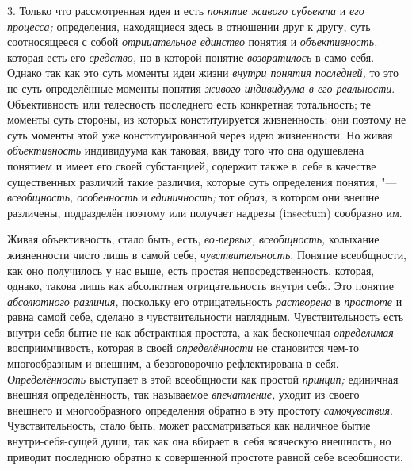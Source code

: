 3. Только что рассмотренная идея и есть {\em понятие живого субъекта}
и {\em его процесса;} определения, находящиеся здесь в отношении друг к другу,
суть соотносящееся с собой {\em отрицательное единство} понятия и
{\em объективность,} которая есть его {\em средство,} но в которой понятие
{\em возвратилось} в само себя. Однако так как это суть моменты идеи жизни
{\em внутри понятия последней,} то это не суть определённые моменты понятия
{\em живого индивидуума в его реальности}.
Объективность или телесность последнего есть
конкретная тотальность; те моменты суть стороны, из которых конституируется
жизненность; они поэтому не суть моменты этой уже конституированной через
идею жизненности. Но живая {\em объективность}
индивидуума как таковая, ввиду того что она одушевлена
понятием и имеет его своей субстанцией, содержит также в~себе в качестве
существенных различий такие различия, которые суть определения понятия, "---
{\em всеобщность, особенность} и {\em единичность;} тот {\em образ,}
в котором они внешне различены, подразделён поэтому или
получает надрезы (insectum) сообразно
им.

Живая объективность, стало быть, есть, {\em во-первых, всеобщность,}
колыхание жизненности чисто лишь в самой себе, {\em чувствительность}.
Понятие всеобщности, как оно получилось у нас выше, есть
простая непосредственность, которая, однако, такова лишь как абсолютная
отрицательность внутри себя. Это понятие {\em абсолютного различия,}
поскольку его отрицательность {\em растворена} в {\em простоте} и равна
самой себе, сделано в чувствительности наглядным. Чувствительность есть
внутри-себя-бытие не как абстрактная простота, а как бесконечная
{\em определимая} восприимчивость, которая в своей {\em определённости} не
становится чем-то многообразным и внешним, а безоговорочно рефлектирована в
себя. {\em Определённость} выступает в этой всеобщности как простой
{\em принцип;} единичная внешняя определённость, так называемое
{\em впечатление,} уходит из своего внешнего и многообразного определения
обратно в эту простоту {\em самочувствия}.
Чувствительность, стало быть, может рассматриваться как
наличное бытие внутри-себя-сущей души, так как она вбирает в~себя всяческую
внешность, но приводит последнюю обратно к совершенной простоте равной себе
всеобщности.


